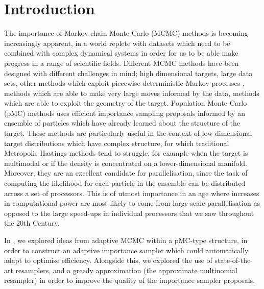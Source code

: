 \documentclass[final]{siamltex}
\begin{document}
\section{Introduction}
The importance of Markov chain Monte Carlo (MCMC) methods is becoming
increasingly apparent, in a world replete with datasets which need to be
combined with complex dynamical systems in order for us to be able
make progress in a range of scientific fields. Different MCMC methods
have been designed with different challenges in mind; high dimensional
targets\cite{cotter2013mcmc}, large data sets\cite{bierkens2016zig},
other methods which exploit piecewise deterministic Markov processes
\cite{bouchard2018bouncy},
methods which are able to make very large moves informed by the
data\cite{teh2016consistency,duane1987hybrid}, methods which are able to exploit
the geometry of the target\cite{girolami2011riemann}. Population Monte Carlo
(pMC) methods uses efficient importance sampling proposals informed by an
ensemble of particles which have already learned about the structure
of the target\cite{cappe2012population,cappe2008adaptive,douc2007convergence,douc2007minimum, martino2017layered, cornuet2012adaptive, martino2015adaptive}. These methods are particularly useful in the context of
low dimensional target distributions which have complex structure, for
which traditional Metropolis-Hastings methods tend to struggle, for
example when the target is multimodal or if the density is
concentrated on a lower-dimensional manifold. Moreover, they are an
excellent candidate for parallelisation, since the task of computing
the likelihood for each particle in the ensemble can be distributed
across a set of processors. This is of utmost importance in an age
where increases in computational power are most likely to come from
large-scale parallelisation as opposed to the large speed-ups in
individual processors that we saw throughout the 20th Century.

In \cite{cotter2015parallel}, we explored ideas from adaptive MCMC within a
pMC-type structure, in order to construct an adaptive importance
sampler which could automatically adapt to optimise
efficiency. Alongside this, we explored the use of state-of-the-art
resamplers\cite{reich2013nonparametric}, and a greedy approximation (the
approximate multinomial resampler) in order to improve the quality of
the importance sampler proposals.
\end{document}
